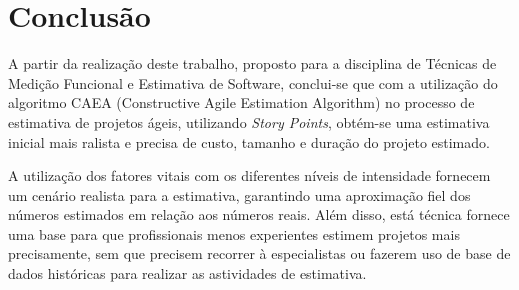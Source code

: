 \chapter[Conclusão]{Conclusão}

A partir da realização deste trabalho, proposto para a disciplina de Técnicas de Medição Funcional e Estimativa de Software,
conclui-se que com a utilização do algoritmo CAEA (Constructive Agile Estimation Algorithm) no processo de estimativa de projetos
ágeis, utilizando \textit{Story Points}, obtém-se uma estimativa inicial mais ralista e precisa de custo, tamanho e duração do projeto estimado.

A utilização dos fatores vitais com os diferentes níveis de intensidade fornecem um cenário realista para a estimativa, garantindo uma
aproximação fiel dos números estimados em relação aos números reais. Além disso, está técnica fornece uma base para que profissionais menos
experientes estimem projetos mais precisamente, sem que precisem recorrer à especialistas ou fazerem uso de base de dados históricas para
realizar as astividades de estimativa.

